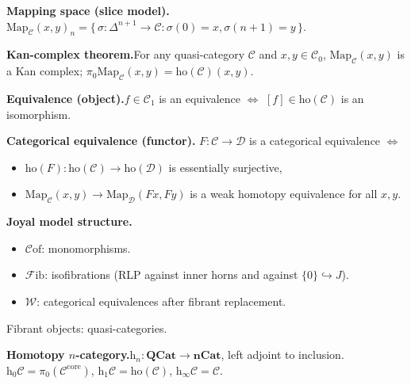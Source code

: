 \begin{formalrestatement}
\textbf{Mapping space (slice model).}\quad
$\mathrm{Map}_\mathcal{C}(x, y)_n = \{\,\sigma : \Delta^{n+1} \to \mathcal{C}
: \sigma(0) = x, \sigma(n+1) = y\,\}$.

\medskip
\textbf{Kan-complex theorem.}\quad For any quasi-category $\mathcal{C}$
and $x, y \in \mathcal{C}_0$, $\mathrm{Map}_\mathcal{C}(x, y)$ is a Kan
complex; $\pi_0 \mathrm{Map}_\mathcal{C}(x, y) = \mathrm{ho}(\mathcal{C})(x, y)$.

\medskip
\textbf{Equivalence (object).}\quad $f \in \mathcal{C}_1$ is an equivalence
$\iff$ $[f] \in \mathrm{ho}(\mathcal{C})$ is an isomorphism.

\medskip
\textbf{Categorical equivalence (functor).}\quad
$F : \mathcal{C} \to \mathcal{D}$ is a categorical equivalence
$\iff$
\begin{itemize}
  \item $\mathrm{ho}(F) : \mathrm{ho}(\mathcal{C}) \to \mathrm{ho}(\mathcal{D})$ is essentially surjective,
  \item $\mathrm{Map}_\mathcal{C}(x, y) \to \mathrm{Map}_\mathcal{D}(Fx, Fy)$ is a weak homotopy equivalence for all $x, y$.
\end{itemize}

\medskip
\textbf{Joyal model structure.}\quad
\begin{itemize}
  \item $\mathcal{C}\mathrm{of}$: monomorphisms.
  \item $\mathcal{F}\mathrm{ib}$: isofibrations (RLP against inner horns and against $\{0\} \hookrightarrow J$).
  \item $\mathcal{W}$: categorical equivalences after fibrant replacement.
\end{itemize}
Fibrant objects: quasi-categories.

\medskip
\textbf{Homotopy $n$-category.}\quad $\mathrm{h}_n : \mathbf{QCat} \to
\mathbf{nCat}$, left adjoint to inclusion.
$\mathrm{h}_0 \mathcal{C} = \pi_0(\mathcal{C}^{\mathrm{core}})$,
$\mathrm{h}_1 \mathcal{C} = \mathrm{ho}(\mathcal{C})$,
$\mathrm{h}_\infty \mathcal{C} = \mathcal{C}$.
\end{formalrestatement}
